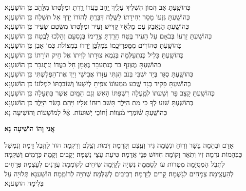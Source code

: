 \documentclass[twoside, openany, parskip=half, 11pt]{book}
\begin{document}
\begin{small}
	כְּהוֹשַֽׁעְתָּ אַב הֲמוֹן הִשְׁלִיךְ עָלֶֽיךָ יַֽהַב בַּעֲדוֹ רַֽדְתָּ וּמִלַּטְתּוֹ מִלַּֽהַב \hfill כֵּן הוֹשַׁעְנָא׃\\
	כְּהוֹשַֽׁעְתָּ גִּזְעוֹ מָסַר יְחִידָתוֹ לַשֶּֽׁלַח דִּבַּרְֽתָּ לְהוֹרוֹ יָדְךָ אַל תִּשְׁלַח \hfill כֵּן הוֹשַׁעְנָא׃ \\
	כְּהוֹשַֽׁעְתָּ הַנֶּאֱבַק עִם מַלְאָךְ קַדִּישׁ וָעִיר וּמִלַּטְתּוֹ מִשֶּֽׂטֶם שָׂעִיר \hfill כֵּן הוֹשַׁעְנָא׃ \\
	כְּהוֹשַֽׁעְתָּ זַרְעוֹ בְּבֹאָם עַל הָעִיר בֶּֽטַח חָרַֽדְתָּ צָרֵֽימוֹ בְּנָסְעָם וְהָלְכוּ לָבֶֽטַח \hfill כֵּן הוֹשַׁעְנָא׃ \\
	כְּהוֹשַֽׁעְתָּ טְהוֹרִים מִמַּפְרִיכֵֽמוֹ בְּמַלְבֵּן יָרְדוּ בִמְצוֹלֹת כְּמוֹ אָבֶן \hfill כֵּן הוֹשַׁעְנָא׃ \\
	כְּהוֹשַֽׁעְתָּ כָּלִיל כְּנִתְעַלְּמָה בְּגֹֽמֶא צוּרָתוֹ לִוִּיתוֹ אֶל חֵיק הוֹרָתוֹ \hfill כֵּן הוֹשַׁעְנָא׃ \\
	כְּהוֹשַֽׁעְתָּ מֻצְנָף בַּד כְּנִתְעַבָּר נֶאֶמָן חָל בַּעֲדוֹ וְנִתְגַּבָּר \hfill כֵּן הוֹשַׁעְנָא׃ \\
	כְּהוֹשַֽׁעְתָּ סֻגַּר בְּיַד יִשְׁבִּי בְּנֹב הַגִּתִּי עֲזָרוֹ אֲבִישַׁי וַיַּךְ אֶת־הַפְּלִשְׁתִּי \hfill כֵּן הוֹשַׁעְנָא׃\\
	כְּהוֹשַֽׁעְתָּ פָּקִיד כְּנָד שֶֽׁבַע מִמְּעוֹנוֹ צִּפִּֽיתָ לְיִשְׁעוֹ וְשׁוֹבַבְתּוֹ לִמְלוֹנוֹ \hfill כֵּן הוֹשַׁעְנָא׃\\
	כְּהוֹשַֽׁעְתָּ קָצַב פָּר וְשַׁעְתּוֹ לְמַֽעְלָה רִשְׁפַּתּוֹ הָאֵשׁ וְגַם הַמַּֽיִם אֲשֶׁר בַּתְּעָלָה \hfill כֵּן הוֹשַׁעְנָא׃\\
	כְּהוֹשַֽׁעְתָּ שִׁוַע לְךָ כִּי מֵת הַיָּֽלֶד תָּשֵׁב רוּחוֹ אֵלָיו וַיָּֽהָם בְּשַׂר הַיָּֽלֶד \hfill כֵּן הוֹשַׁעְנָא׃\\
	כְּהוֹשַֽׁעְתָּ שׁ֗וֹמְרֵי מִ֗צְווֹת וְ֗חוֹכֵי יְשׁוּעוֹת. אֵ֗ל֗ לְמוֹשָׁעוֹת \hfill וְהוֹשִׁיעָה נָּא׃\\
	
\end{small}




\begin{large}
	\textbf{אֲנִי וָהוֹ הוֹשִֽׁיעָה נָּא׃}
\end{large}

\hoshia


\sepline

\label{hoshanarabba}

אָדָם וּבְהֵמָה׃ בָּשָׂר וְרֽוּחַ וּנְשָׁמָה׃ גִּיד וְעֶֽצֶם וְקָרְמָה׃ דְּמוּת וְצֶֽלֶם וְרִקְמָה׃ הוֹד לַהֶֽבֶל דָּמָה׃ וְנִמְשַׁל כַּבְּהֵמוֹת נִדְמָה׃ זִיו וְתֹֽאַר וְקוֹמָה׃ חִדּוּשׁ פְּנֵי אֲדָמָה׃ טִיעַת עֲצֵי נְשַׁמָּה׃ יְקָבִים וְקָמָה׃ כְּרָמִים וְשִׁקְמָה׃ לְתֵבֵל הַמְסֻיָּמָה׃ מִטְרוֹת עֹז לְסַמְּמָה׃ נְשִׁיָּה לְקַיְּמָה׃ שִׂיחִים לְקוֹמְמָה׃ עֲדָנִים לְעָצְמָה׃ פְּרָחִים לְהַעֲצִֽימָה׃ צְמָחִים לְגָשְׁמָה׃ קָרִים לְזָרְמָה׃ רְבִיבִים לְשַׁלְּמָה׃
שְׁתִיָּה לְרוֹמֵֽמָה׃ הוֹשַׁענָא׃
תְּלוּיָה עַל בְּלִימָה הוֹשַׁענָא׃
\end{document}
